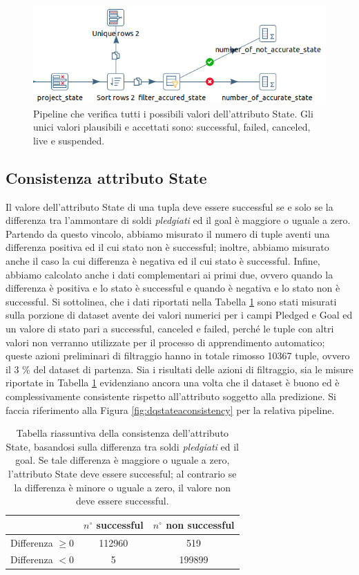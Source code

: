 \begin{figure}[h!]
	\centering
	\includegraphics[width=0.7\linewidth]{images/DQ_stateaccuracy}
	\caption{Pipeline che verifica tutti i possibili valori dell'attributo State. Gli unici valori plausibili e accettati sono: successful, failed, canceled, live e suspended.}
	\label{fig:dqstateaccuracy}
\end{figure}
\newpage
\subsection{Consistenza attributo State}
Il valore dell'attributo State di una tupla deve essere successful se e solo se la differenza tra l'ammontare di soldi \textit{pledgiati} ed il goal è maggiore o uguale a zero.
Partendo da questo vincolo, abbiamo misurato il numero di tuple aventi una differenza positiva ed il cui stato non è successful; inoltre, abbiamo misurato anche il caso la cui differenza è negativa ed il cui stato è successful.
Infine, abbiamo calcolato anche i dati complementari ai primi due, ovvero quando la differenza è positiva e lo stato è successful e quando è negativa e lo stato non è successful.
Si sottolinea, che i dati riportati nella Tabella \ref{tab:cons_state} sono stati misurati sulla porzione di dataset avente dei valori numerici per i campi Pledged e Goal ed un valore di stato pari a successful, canceled e failed, perché le tuple con altri valori non verranno utilizzate per il processo di apprendimento automatico; queste azioni preliminari di filtraggio hanno in totale rimosso 10367 tuple, ovvero il 3 \% del dataset di partenza. 
Sia i risultati delle azioni di filtraggio, sia le misure riportate in Tabella \ref{tab:cons_state} evidenziano ancora una volta che il dataset è buono ed è complessivamente consistente rispetto all'attributo soggetto alla predizione.
Si faccia riferimento alla Figura \ref{fig:dqstateaconsistency} per la relativa pipeline.
\begin{table}
	\caption{Tabella riassuntiva della consistenza dell'attributo State, basandosi sulla differenza tra soldi \textit{pledgiati} ed il goal. Se tale differenza è maggiore o uguale a zero, l'attributo State deve essere successful; al contrario se la differenza è minore o uguale a zero, il valore non deve essere successful.}
	
	\label{tab:cons_state}
	
	\centering
	\begin{tabular}{c|cc}
		& $n^{\circ}$ successful & $n^{\circ}$ non successful \\
		\hline
		\rule{0pt}{13pt}Differenza $\geq 0$  & 112960 & 519 \\ 
		\rule{0pt}{13pt}Differenza $< 0$& 5 & 199899 \\
	\end{tabular}
\end{table} 
